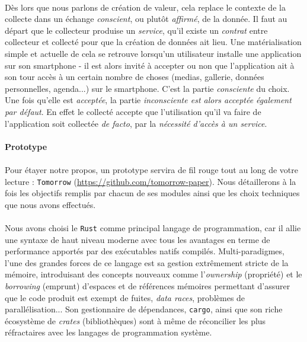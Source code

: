 \paragraph{} Dès lors que nous parlons de création de valeur, cela replace le contexte de la collecte dans un échange
\emph{conscient}, ou plutôt \emph{affirmé}, de la donnée. Il faut au départ que le collecteur produise un \emph{service},
qu'il existe un \emph{contrat} entre collecteur et collecté pour que la création de données ait lieu. Une matérialisation
simple et actuelle de cela se retrouve lorsqu'un utilisateur installe une application sur son smartphone - il est
alors invité à accepter ou non que l'application ait à son tour accès à un certain nombre de choses (medias, gallerie,
données personnelles, agenda...) sur le smartphone. C'est la partie \emph{consciente} du choix. Une fois qu'elle est
\emph{acceptée}, la partie \emph{inconsciente est alors acceptée également par défaut}. En effet le collecté accepte que
l'utilisation qu'il va faire de l'application soit collectée \emph{de facto}, par la \emph{nécessité d'accès à un service}.

\paragraph{Prototype}

\paragraph{} Pour étayer notre propos, un prototype servira de fil rouge tout au long de votre lecture : \lstinline{Tomorrow}
(\url{https://github.com/tomorrow-paper}). Nous détaillerons à la fois les objectifs remplis par chacun de ses modules
ainsi que les choix techniques que nous avons effectués.

\paragraph{} Nous avons choisi le \lstinline{Rust} \cite{Rust0} comme principal langage de programmation, car il allie une syntaxe
de haut niveau moderne avec tous les avantages en terme de performance apportés par des exécutables natifs compilés.
Multi-paradigmes, l'une des grandes forces de ce langage est sa gestion extrêmement stricte de la mémoire, introduisant
des concepts nouveaux comme l'\emph{ownership} (propriété) et le \emph{borrowing} (emprunt) d'espaces et de références 
mémoires permettant d'assurer que le code produit est exempt de fuites, \emph{data races}, problèmes de parallélisation...
Son gestionnaire de dépendances, \lstinline{cargo}, ainsi que son riche écosystème de \emph{crates} (bibliothèques) sont
à même de réconcilier les plus réfractaires avec les langages de programmation système.

